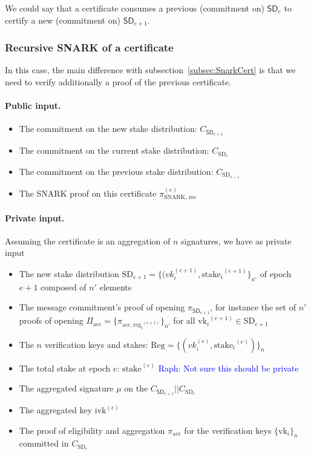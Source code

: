 \documentclass{article}
\newcommand{\vk}[1]{\ensuremath{\textrm{vk}_{#1}}\xspace}
\newcommand{\acc}{\ensuremath{\textrm{acc}}\xspace}
\newcommand{\reg}[1]{\ensuremath{\textrm{reg}_{#1}}\xspace}
\newcommand{\stake}[1]{\ensuremath{\textrm{stake}_{#1}}\xspace}
\newcommand{\ivk}{\ensuremath{\textrm{ivk}}\xspace}
\newcommand{\raph}[1]{\textcolor{blue}{Raph: #1}\xspace}
\begin{document}
We could say that a certificate consumes a previous (commitment on) $\textsf{SD}_{e}$ to certify a new (commitment on) $\textsf{SD}_{e+1}$.

%
\subsubsection{Recursive SNARK of a certificate}\label{subsub:RecSnarkCert}
In this case, the main difference with subsection~\ref{subsec:SnarkCert} is that we need to verify additionally a proof of the previous certificate.


\paragraph{Public input.}
\begin{itemize}
    \item The commitment on the new stake distribution: $C_{\textsf{SD}_{e+1}}$
    \item The commitment on the current stake distribution: $C_{\text{SD}_e}$
    \item The commitment on the previous stake distribution: $C_{\text{SD}_{e-1}}$
    \item The SNARK proof on this certificate $\pi_\text{SNARK, rec}^{(e)}$
\end{itemize}

\paragraph{Private input.}
Assuming the certificate is an aggregation of $n$ signatures, we have as private input

\begin{itemize}
    \item The new stake distribution $\text{SD}_{e+1} = \{ (vk_i^{(e+1)}, \stake{i}^{(e+1)} \}_{n'} $ of epoch $e+1$ composed of $n'$ elements
    \item The message commitment's proof of opening $\pi_{\textsf{SD}_{e+1}}$, for instance the set of $n'$ proofs of opening $\Pi_\acc = \{ \pi_{\acc, \reg{i}^{(e+1)}} \}_{n'}$  for all $\vk{i}^{(e+1)} \in \text{SD}_{e+1}$
    \item The $n$ verification keys and stakes: $\text{Reg} = \{ (vk_i^{(e)}, \stake{i}^{(e)} ) \}_n$
    \item The total stake at epoch $e$: $\stake{}^{(e)}$ \raph{Not sure this should be private}
    \item The aggregated signature $\mu$ on the $C_{\textsf{SD}_{e+1}} || C_{\text{SD}_e}$
    \item The aggregated key $\ivk^{(e)}$
    \item The proof of eligibility and aggregation $\pi_{\acc}$ for the verification keys $\{\vk{i}\}_n$ committed in $C_{\text{SD}_e}$
\end{itemize}
\end{document}
